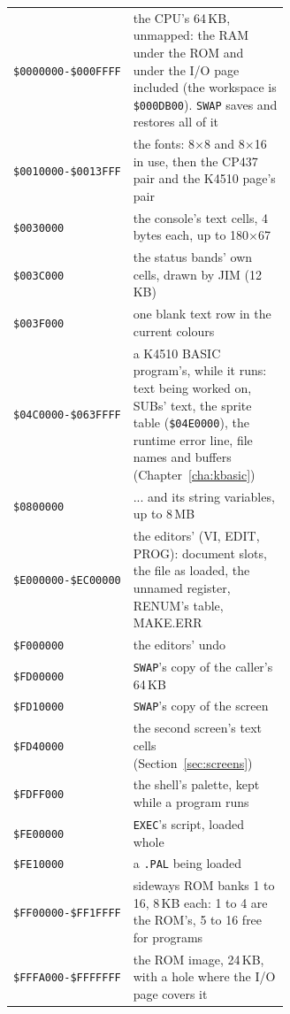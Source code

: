 \begin{center}
\small
\begin{tabular}{@{}l >{\raggedright\arraybackslash}p{0.62\linewidth}@{}}
\toprule
\texttt{\$0000000-\$000FFFF} & the CPU's 64\,KB, unmapped: the RAM under the ROM and under the I/O page included (the workspace is \texttt{\$000DB00}). \verb|SWAP| saves and restores all of it\\
\texttt{\$0010000-\$0013FFF} & the fonts: 8$\times$8 and 8$\times$16 in use, then the CP437 pair and the K4510 page's pair\\
\texttt{\$0030000} & the console's text cells, 4 bytes each, up to 180$\times$67\\
\texttt{\$003C000} & the status bands' own cells, drawn by JIM (12\,KB)\\
\texttt{\$003F000} & one blank text row in the current colours\\
\texttt{\$04C0000-\$063FFFF} & a K4510 BASIC program's, while it runs: text being worked on, SUBs' text, the sprite table (\texttt{\$04E0000}), the runtime error line, file names and buffers (Chapter~\ref{cha:kbasic})\\
\texttt{\$0800000} & ... and its string variables, up to 8\,MB\\
\texttt{\$E000000-\$EC00000} & the editors' (VI, EDIT, PROG): document slots, the file as loaded, the unnamed register, RENUM's table, MAKE.ERR\\
\texttt{\$F000000} & the editors' undo\\
\texttt{\$FD00000} & \verb|SWAP|'s copy of the caller's 64\,KB\\
\texttt{\$FD10000} & \verb|SWAP|'s copy of the screen\\
\texttt{\$FD40000} & the second screen's text cells (Section~\ref{sec:screens})\\
\texttt{\$FDFF000} & the shell's palette, kept while a program runs\\
\texttt{\$FE00000} & \verb|EXEC|'s script, loaded whole\\
\texttt{\$FE10000} & a \texttt{.PAL} being loaded\\
\texttt{\$FF00000-\$FF1FFFF} & sideways ROM banks 1 to 16, 8\,KB each: 1 to 4 are the ROM's, 5 to 16 free for programs\\
\texttt{\$FFFA000-\$FFFFFFF} & the ROM image, 24\,KB, with a hole where the I/O page covers it\\
\bottomrule
\end{tabular}
\end{center}

